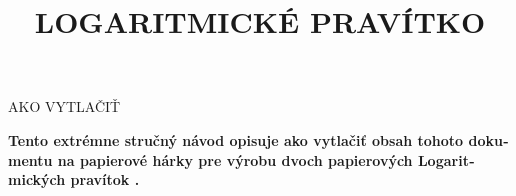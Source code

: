 
\usepackage{polyglossia}
\setdefaultlanguage{slovak}
\newcommand{\makefulltitle}{Ako vytlačiť Logaritmické pravítko }



\title{\fontsize{60}{60}\selectfont LOGARITMICKÉ PRAVÍTKO}
\preauthor{}\postauthor{}\author{}
\predate{}\postdate{}\date{}


  \begin{center}
    \headingfont\fontsize{32}{32}\selectfont AKO VYTLAČIŤ
  \end{center}

  {\let\newpage\relax\maketitle}%
  \nosection{}
  \large\textbf{\makeperex Tento extrémne stručný návod opisuje ako vytlačiť obsah tohoto dokumentu na papierové hárky pre výrobu dvoch papierových Logaritmických pravítok \modelname.}

